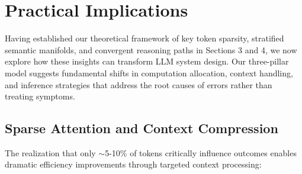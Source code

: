 \documentclass{article}
\begin{document}
\section{Practical Implications}

Having established our theoretical framework of key token sparsity, stratified semantic manifolds, and convergent reasoning paths in Sections 3 and 4, we now explore how these insights can transform LLM system design. Our three-pillar model suggests fundamental shifts in computation allocation, context handling, and inference strategies that address the root causes of errors rather than treating symptoms.

\subsection{Sparse Attention and Context Compression}

The realization that only $\sim$5-10\% of tokens critically influence outcomes enables dramatic efficiency improvements through targeted context processing:
\end{document}
